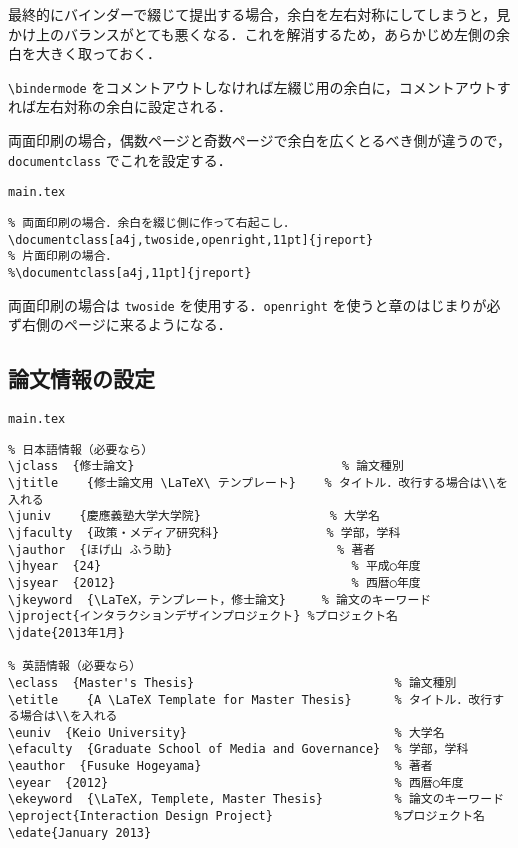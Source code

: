 最終的にバインダーで綴じて提出する場合，余白を左右対称にしてしまうと，見かけ上のバランスがとても悪くなる．これを解消するため，あらかじめ左側の余白を大きく取っておく．

\verb|\bindermode| をコメントアウトしなければ左綴じ用の余白に，コメントアウトすれば左右対称の余白に設定される．

両面印刷の場合，偶数ページと奇数ページで余白を広くとるべき側が違うので，\verb|documentclass| でこれを設定する．

\begin{itembox}[l]{{\tt main.tex}}
\begin{verbatim}
% 両面印刷の場合．余白を綴じ側に作って右起こし．
\documentclass[a4j,twoside,openright,11pt]{jreport}
% 片面印刷の場合．
%\documentclass[a4j,11pt]{jreport}
\end{verbatim}
\end{itembox}

両面印刷の場合は \verb|twoside| を使用する．\verb|openright| を使うと章のはじまりが必ず右側のページに来るようになる．

\subsection{論文情報の設定}
\label{sec:meta}

\begin{itembox}[l]{{\tt main.tex}}
\begin{verbatim}
% 日本語情報（必要なら）
\jclass  {修士論文}                             % 論文種別
\jtitle    {修士論文用 \LaTeX\ テンプレート}    % タイトル．改行する場合は\\を入れる
\juniv    {慶應義塾大学大学院}                  % 大学名
\jfaculty  {政策・メディア研究科}               % 学部，学科
\jauthor  {ほげ山 ふう助}                       % 著者
\jhyear  {24}                                   % 平成○年度
\jsyear  {2012}                                 % 西暦○年度
\jkeyword  {\LaTeX，テンプレート，修士論文}     % 論文のキーワード
\jproject{インタラクションデザインプロジェクト} %プロジェクト名
\jdate{2013年1月}

% 英語情報（必要なら）
\eclass  {Master's Thesis}                            % 論文種別
\etitle    {A \LaTeX Template for Master Thesis}      % タイトル．改行する場合は\\を入れる
\euniv  {Keio University}                             % 大学名
\efaculty  {Graduate School of Media and Governance}  % 学部，学科
\eauthor  {Fusuke Hogeyama}                           % 著者
\eyear  {2012}                                        % 西暦○年度
\ekeyword  {\LaTeX, Templete, Master Thesis}          % 論文のキーワード
\eproject{Interaction Design Project}                 %プロジェクト名
\edate{January 2013}
\end{verbatim}
\end{itembox}


